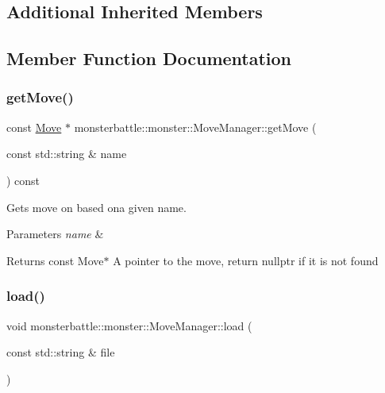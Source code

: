 \subsection*{Additional Inherited Members}


\subsection{Member Function Documentation}
\mbox{\label{classmonsterbattle_1_1monster_1_1MoveManager_a9f4afb738df41bba6c75af2234c4ec17}} 
\subsubsection{\texorpdfstring{get\+Move()}{getMove()}}
{\footnotesize\ttfamily const \hyperlink{classmonsterbattle_1_1monster_1_1Move}{Move} $\ast$ monsterbattle\+::monster\+::\+Move\+Manager\+::get\+Move (\begin{DoxyParamCaption}\item[{const std\+::string \&}]{name }\end{DoxyParamCaption}) const}



Gets move on based ona given name. 


\begin{DoxyParams}{Parameters}
{\em name} & \\
\hline
\end{DoxyParams}
\begin{DoxyReturn}{Returns}
const Move$\ast$ A pointer to the move, return nullptr if it is not found 
\end{DoxyReturn}
\mbox{\label{classmonsterbattle_1_1monster_1_1MoveManager_a977b4425970b87bb0350a7d862755b50}} 
\subsubsection{\texorpdfstring{load()}{load()}}
{\footnotesize\ttfamily void monsterbattle\+::monster\+::\+Move\+Manager\+::load (\begin{DoxyParamCaption}\item[{const std\+::string \&}]{file }\end{DoxyParamCaption})}



